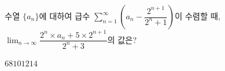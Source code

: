 수열 $\{a_n\}$에 대하여 급수 $\displaystyle\sum_{n=1}^{\infty}\left(a_n-\dfrac{2^{n+1}}{2^n+1}\right)$이 수렴할 때, $\displaystyle\lim_{n\to\infty}\dfrac{2^n\times a_n+5\times 2^{n+1}}{2^n+3}$의 값은?
\begin{choices32}{$6$}{$8$}{$10$}{$12$}{$14$}\end{choices32}
